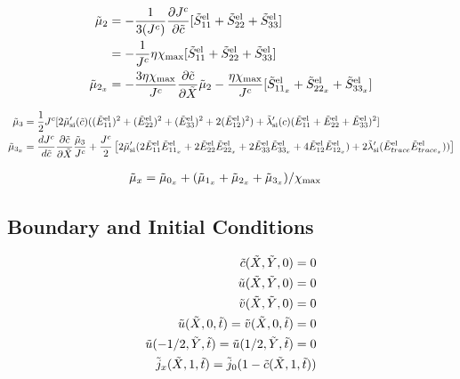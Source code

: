 \documentclass[../main.tex]{subfiles}
\begin{document}
\begin{align}
    \td{\mu}_2 &= -\fc{1}{3(\jc)}\pdiff{ \jc}{\tc}[\tSel{11} + \tSel{22} + \tSel{33}] \\
     &= -\fc{1}{\jc} \eta\xmax [\tSel{11} + \tSel{22} + \tSel{33}] \\
     \td{\mu}_{2_x} &= -\fc{3\eta\xmax}{\jc}\tcx \td{\mu}_2 - \fc{\eta\xmax}{\jc}[\tSel{11_x} + \tSel{22_x} + \tSel{33_x}] 
\end{align}

\begin{align}
     \td{\mu}_3 &= \fc{1}{2}\jc[2\tmusi'(\td{c})((\tEel{11})^2 + (\tEel{22})^2 + (\tEel{33})^2 + 2 (\tEel{12})^2) + \tlamsi'(c)(\tEel{11} + \tEel{22} + \tEel{33})^2]\\
      \td{\mu}_{3_x} &= \djc \tcx \fc{\td{\mu}_3}{\jc} + \fc{\jc}{2}\left[2\tmusi'( 2\tEel{11}\tEel{11_x} + 2\tEel{22}\tEel{22_x} + 2\tEel{33}\tEel{33_x} + 4\tEel{12}\tEel{12_x}) + 2\tlamsi'(\tEel{trace}\tEel{trace_x}) )   \right]
\end{align}

\begin{align}
\td{\mu}_x &= \td{\mu}_{0_x} + (\td{\mu}_{1_x} + \td{\mu}_{2_x} + \td{\mu}_{3_x})/\xmax 
\end{align}

\subsection{Boundary and Initial Conditions}
\begin{center}
    \begin{align}
        \tc(\tX, \tY, 0) = 0 \\
        \tu(\tX, \tY, 0) = 0 \\
        \tv(\tX, \tY, 0) = 0 \\
        \tu(\tX, 0, \tt) = \tv(\tX, 0, \tt) = 0 \\
        \tu(-1/2, \tY, \tt) =  \tu(1/2, \tY, \tt) = 0 \\
        \td{j}_x(\tX, 1, \tt) = \td{j}_0 (1 - \tc(\tX, 1, \tt))
     \end{align}     
\end{center}
\end{document}
